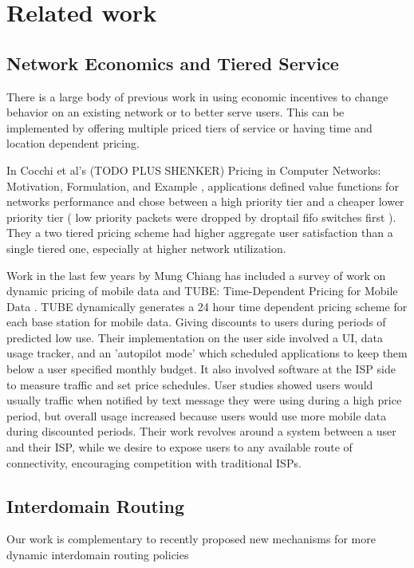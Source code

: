\label{sec:related}
\section{Related work}

\subsection{Network Economics and Tiered Service}
There is a large body of previous work in using economic incentives to change behavior on an existing network or to better serve users. This can be implemented by offering multiple priced tiers of service or having time and location dependent pricing.

In Cocchi et al's (TODO PLUS SHENKER) Pricing in Computer Networks: Motivation, Formulation, and Example \cite{cocchi93}, applications defined value functions for networks performance and chose between a high priority tier and a cheaper lower priority tier ( low priority packets were dropped by droptail fifo switches first ). They a two tiered pricing scheme had higher aggregate user satisfaction than a single tiered one, especially at higher network utilization.

Work in the last few years by Mung Chiang has included a survey of work on dynamic pricing of mobile data \cite{pricingdata13} and TUBE: Time-Dependent Pricing for Mobile Data \cite{tube12}.
TUBE dynamically generates a 24 hour time dependent pricing scheme for each base station for mobile data. Giving discounts to users during periods of predicted low use.
Their implementation on the user side involved a UI, data usage tracker, and an 'autopilot mode' which scheduled applications to keep them below a user specified monthly budget. It also involved software at the ISP side to measure traffic and set price schedules.
User studies showed users would usually traffic when notified by text message they were using during a high price period, but overall usage increased because users would use more mobile data during discounted periods.
Their work revolves around a system between a user and their ISP, while we desire to expose users to any available route of connectivity, encouraging competition with traditional ISPs.

\subsection{Interdomain Routing}
Our work is complementary to recently proposed new mechanisms for more dynamic interdomain routing policies


